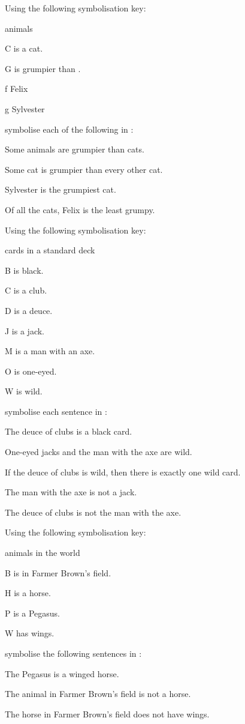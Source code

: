 \problempart
Using the following symbolisation key:
\begin{ekey}
\item[\domain] animals
\item[C]  is a cat.
\item[G]  is grumpier than .
\item[f] Felix 
\item[g] Sylvester
\end{ekey}
symbolise each of the following in \FOL:
\begin{earg}
\item  Some animals are grumpier than cats.
\item Some cat is grumpier than every other cat.
\item Sylvester is the grumpiest cat.
\item Of all the cats, Felix is the least grumpy.
\end{earg}

\problempart
\label{pr.FOLcards}
Using the following symbolisation key:
\begin{ekey}
\item[\domain] cards in a standard deck
\item[B]  is black.
\item[C]  is a club.
\item[D]  is a deuce.
\item[J]  is a jack.
\item[M]  is a man with an axe.
\item[O]  is one-eyed.
\item[W]  is wild.
\end{ekey}
symbolise each sentence in \FOL:
\begin{earg}
\item The deuce of clubs is a black card.
\item One-eyed jacks and the man with the axe are wild.
\item If the deuce of clubs is wild, then there is exactly one wild card.
\item The man with the axe is not a jack.
\item The deuce of clubs is not the man with the axe.
\end{earg}


\problempart Using the following symbolisation key:
\begin{ekey}
\item[\domain] animals in the world
\item[B]  is in Farmer Brown's field.
\item[H]  is a horse.
\item[P]  is a Pegasus.
\item[W]  has wings.
\end{ekey}
symbolise the following sentences in \FOL:
\begin{earg}
\item The Pegasus is a winged horse.
\item The animal in Farmer Brown's field is not a horse.
\item The horse in Farmer Brown's field does not have wings.
\end{earg}

